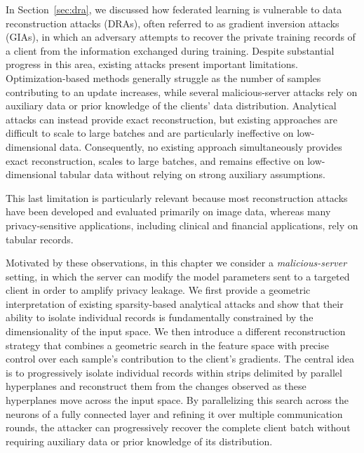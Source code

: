 In Section~\ref{sec:dra}, we discussed how federated learning is vulnerable to data reconstruction attacks (DRAs), often referred to as gradient inversion attacks (GIAs), in which an adversary attempts to recover the private training records of a client from the information exchanged during training. Despite substantial progress in this area, existing attacks present important limitations. Optimization-based methods generally struggle as the number of samples contributing to an update increases, while several malicious-server attacks rely on auxiliary data or prior knowledge of the clients' data distribution. Analytical attacks can instead provide exact reconstruction, but existing approaches are difficult to scale to large batches and are particularly ineffective on low-dimensional data. Consequently, no existing approach simultaneously provides exact reconstruction, scales to large batches, and remains effective on low-dimensional tabular data without relying on strong auxiliary assumptions.

This last limitation is particularly relevant because most reconstruction attacks have been developed and evaluated primarily on image data, whereas many privacy-sensitive applications, including clinical and financial applications, rely on tabular records. 

Motivated by these observations, in this chapter we consider a \emph{malicious-server} setting, in which the server can modify the model parameters sent to a targeted client in order to amplify privacy leakage. We first provide a geometric interpretation of existing sparsity-based analytical attacks and show that their ability to isolate individual records is fundamentally constrained by the dimensionality of the input space. We then introduce a different reconstruction strategy that combines a geometric search in the feature space with precise control over each sample's contribution to the client's gradients. The central idea is to progressively isolate individual records within strips delimited by parallel hyperplanes and reconstruct them from the changes observed as these hyperplanes move across the input space. By parallelizing this search across the neurons of a fully connected layer and refining it over multiple communication rounds, the attacker can progressively recover the complete client batch without requiring auxiliary data or prior knowledge of its distribution.

